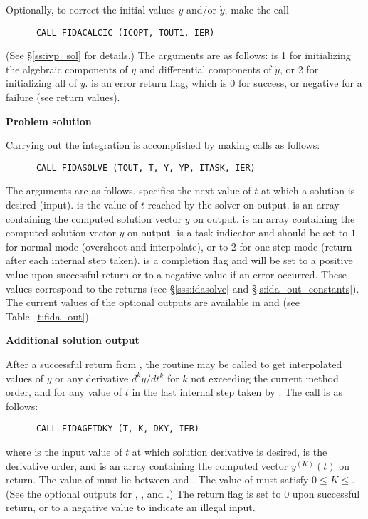 \begin{Steps}
  Optionally, to correct the initial values $y$ and/or $\dot{y}$, make the call
\begin{verbatim}
      CALL FIDACALCIC (ICOPT, TOUT1, IER)
\end{verbatim}
  (See \S\ref{ss:ivp_sol} for details.)  The arguments are as follows:
   is 1 for initializing the algebraic components of $y$ and
  differential components of $\dot{y}$, or 2 for initializing all of $y$.
   is an error return flag, which is 0 for success, or negative
  for a failure (see  return values).

\item {\bf Problem solution}

  Carrying out the integration is accomplished by making calls as follows:
\begin{verbatim}
      CALL FIDASOLVE (TOUT, T, Y, YP, ITASK, IER)
\end{verbatim}
  The arguments are as follows.
   specifies the next value of $t$ at which a solution is desired (input).
   is the value of $t$ reached by the solver on output.
   is an array containing the computed solution vector $y$ on output.
   is an array containing the computed solution vector $\dot{y}$ on output.
   is a task indicator and should be set to $1$ for normal mode 
  (overshoot  and interpolate), or to $2$ for one-step mode 
  (return after each internal step taken).
   is a completion flag and will be set to a positive value upon
  successful return or to a negative value if an error occurred. These values
  correspond to the  returns (see \S\ref{sss:idasolve} and \S\ref{s:ida_out_constants}).
  The current values of the optional outputs are available in  and
   (see Table~\ref{t:fida_out}).
  
\item {\bf Additional solution output}

  After a successful return from , the routine  may
  be called to get interpolated values of $y$ or any derivative $d^k y/dt^k$
  for $k$ not exceeding the current method order, and for any value of $t$ in
  the last internal step taken by {\ida}.  The call is as follows:
\begin{verbatim}
      CALL FIDAGETDKY (T, K, DKY, IER)
\end{verbatim}
  where
   is the input value of $t$ at which solution derivative is desired,
   is the derivative order, and
   is an array containing the computed vector $y^{(K)}(t)$ on return.
  The value of  must lie between  and .
  The value of  must satisfy $0 \leq K \leq $. (See the
  optional outputs for , , and .)
  The return flag  is set to $0$ upon successful return, or to a
  negative value to indicate an illegal input.
  

\end{Steps}
